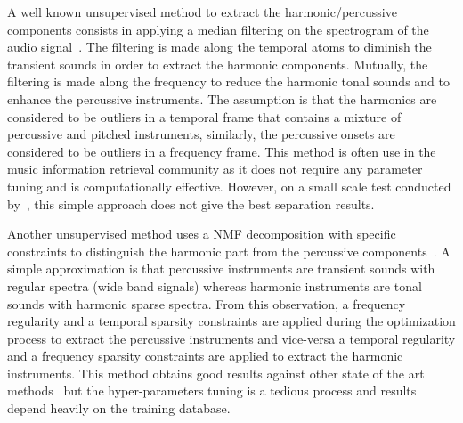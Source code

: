 
A well known unsupervised method to extract the harmonic/percussive components consists in applying a median filtering on the spectrogram of the audio signal~\cite{fitzgerald2010harmonic,ono2008separation}. The filtering is made along the temporal atoms to diminish the transient sounds in order to extract the harmonic components. Mutually, the filtering is made along the frequency to reduce the harmonic tonal sounds and to enhance the percussive instruments. The assumption is that the harmonics are considered to be outliers in a temporal frame that contains a mixture of percussive and pitched instruments, similarly, the percussive onsets are considered to be outliers in a frequency frame. This method is often use in the music information retrieval community as it does not require any parameter tuning and is computationally effective. However, on a small scale test conducted by~\cite{canadas2014percussive}, this simple approach does not give the best separation results.%

Another unsupervised method uses a NMF decomposition with specific constraints to distinguish the harmonic part from the percussive components~\cite{canadas2014percussive}. A simple approximation is that percussive instruments are transient sounds with regular spectra (wide band signals) whereas harmonic instruments are tonal sounds with harmonic sparse spectra. From this observation, a frequency regularity and a temporal sparsity constraints are applied during the optimization process to extract the percussive instruments and vice-versa a temporal regularity and a frequency sparsity constraints are applied to extract the harmonic instruments. This method obtains good results against other state of the art methods~\cite{canadas2014percussive} but the hyper-parameters tuning is a tedious process and results depend heavily on the training database.

